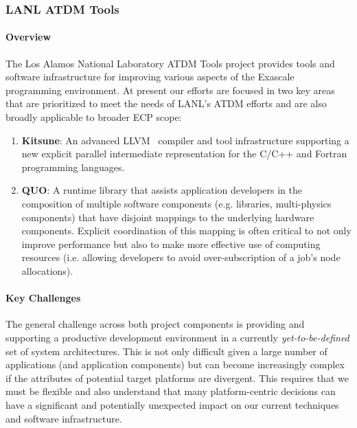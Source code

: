 \subsubsection{LANL ATDM Tools}

\paragraph{Overview}
The Los Alamos National Laboratory ATDM Tools project provides tools and software 
infrastructure for improving various aspects of the Exascale programming 
environment.  At present our efforts are focused in two key areas that are prioritized 
to meet the needs of LANL's ATDM efforts and are also broadly applicable to broader 
ECP scope: 

\begin{enumerate}

 \item \textbf{Kitsune}: An advanced LLVM~\cite{LLVM:2018} compiler 
        and tool infrastructure supporting a new explicit parallel intermediate 
        representation for the C/C++ and Fortran programming languages. 
        
 \item \textbf{QUO}: A runtime library that assists application developers in the 
        composition of multiple software components (e.g. libraries, multi-physics 
        components) that have disjoint mappings to the underlying hardware components.
        Explicit coordination of this mapping is often critical to not only improve
        performance but also to make more effective use of computing resources (i.e. 
        allowing developers to avoid over-subscription of a job's node allocations).
        
\end{enumerate}

\paragraph{Key Challenges}
The general challenge across both project components is providing and supporting a 
productive development environment in a currently \emph{yet-to-be-defined} set of 
system architectures.  This is not only difficult given a large number of applications 
(and application components) but can become increasingly complex if the attributes of 
potential target platforms are divergent. This requires that we must be flexible and also
understand that many platform-centric decisions can have a significant and potentially 
unexpected impact on our current techniques and software infrastructure. 

